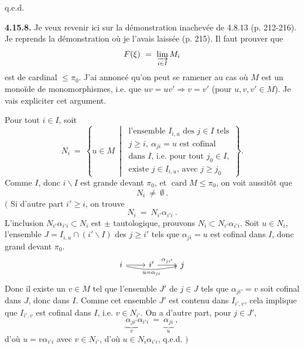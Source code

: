 \documentclass[11pt]{article}
\newcommand{\printedpage}[1]{\marginpar{\footnotesize p.~#1}}
\newcommand{\msp}[1]{\marginpar{\footnotesize [#1]}}
\newcommand{\card}{\operatorname{card}}
\begin{document}
\hfill q.e.d.

\printedpage{175}

\msp{page 453}
\textbf{4.15.8.} Je veux revenir ici sur la démonstration inachevée de 4.8.13 (p. 212-216). Je reprends la démonstration où je l'avais laissée (p. 215). Il faut prouver que
\[
F(\xi) \ = \ \varinjlim_{i\in I} M_i
\]
est de cardinal $\leqslant \pi_0$. J'ai annoncé qu'on peut se ramener au cas où $M$ est un monoïde de monomorphismes, i.e. que $uv = uv' \Longrightarrow v = v'$ (pour $u,v,v' \in M$). Je vais expliciter cet argument.

Pour tout $i\in I$, soit
\[
N_i \ = \ \left\{ u \in M \ \middle| \ \begin{array}{l}
\text{l'ensemble } I_{i,u} \text{ des } j\in I \text{ tels}\\
j \geqslant i,\ \alpha_{ji} = u \text{ est cofinal}\\
\text{dans } I\text{, i.e. pour tout } j_0\in I,\\
\text{existe } j \in I_{i,u}\text{, avec } j \geqslant j_0
\end{array} \right\} .
\tag*{(4.15.8.1)}
\]
Comme $I$, donc $i\backslash I$ est grande devant $\pi_0$, et $\card M \leqslant \pi_0$, on voit aussitôt que
\[
N_i \ \neq \ \emptyset \ .
\tag*{(4.15.8.2)}
\]
$\Big($ Si d'autre part $i' \geqslant i$, on trouve
\[
N_i \ = \ N_{i'}\alpha_{i'i} \ .
\tag*{(4.15.8.3)}
\]
L'inclusion $N_{i'}\alpha_{i'i} \subset N_i$ est $\pm$ tautologique, prouvons $N_i \subset N_{i'}\alpha_{i'i}$. Soit $u \in N_i$, l'ensemble $J = I_{i,u} \cap (i'\backslash I)$ des $j \geqslant i'$ tels que $\alpha_{ji} = u$ est cofinal dans $I$, donc grand devant $\pi_0$.
\[
\begin{tikzcd}
i \arrow[r] \arrow[rr, bend right=12, "u = \alpha_{ji}"'] & i' \arrow[r, "\alpha_{ji'}"] & j
\end{tikzcd}
\]
Donc il existe un $v \in M$ tel que l'ensemble $J'$ de $j\in J$ tels que $\alpha_{ji'} = v$
\msp{page 454}
soit cofinal dans $J$, donc dans $I$. Comme cet ensemble $J'$ est contenu dans $I_{i',v}$, cela implique que $I_{i',v}$ est cofinal dans $I$, i.e. $v \in N_{i'}$. On a d'autre part, pour $j \in J'$,
\[
\underbrace{\alpha_{ji'}}_{v}\alpha_{i'i} \ = \ \underbrace{\alpha_{ji}}_{u} \ ,
\]
d'où $u = v\alpha_{i'i}$ avec $v\in N_{i'}$, d'où $u \in N_i\alpha_{i'i}$, q.e.d. $\Big)$ %
\end{document}
